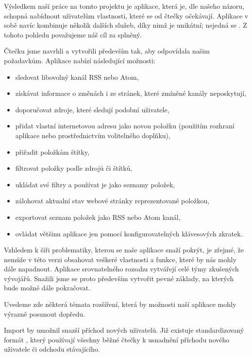 
Výsledkem naší práce na tomto projektu je aplikace, která je, dle našeho názoru, schopná nabídnout uživatelům vlastnosti, které se od čtečky očekávají.
Aplikace v sobě navíc kombinuje několik dalších služeb, díky nimž je unikátní; nejedná se .
Z tohoto pohledu považujeme náš cíl za splněný.


Čtečku jsme navrhli a vytvořili především tak, aby odpovídala našim požadavkům.
Aplikace nabízí následující možnosti:
\begin{itemize}
	\item sledovat libovolný kanál RSS nebo Atom,
	\item získávat informace o změnách i ze stránek, které zmíněné kanály neposkytují,
	\item doporučovat zdroje, které sledují podobní uživatele,
	\item přidat vlastní internetovou adresu jako novou položku (použitím rozhraní aplikace nebo prostřednictvím volitelného doplňku),
	\item přiřadit položkám štítky,
	\item filtrovat položky podle zdrojů či štítků,
	\item ukládat své filtry a používat je jako seznamy položek,
	\item zálohovat aktualní stav webové stránky reprezentované položkou,
	\item exportovat seznam položek jako RSS nebo Atom kanál,
	\item ovládat většinu aplikace jen pomocí konfigurovatelných klávesových zkratek.
\end{itemize}


Vzhledem k šíři problematiky, kterou se naše aplikace snaží pokrýt, je zřejmé, že nemůže v této verzi obsahovat veškeré vlastnosti a funkce, které by nás mohly dále napadnout.
Aplikace srovnatelného rozsahu vytvářejí celé týmy zkušených vývojářů.
Snažili jsme se proto především vytvořit pevné základy, na kterých bude možné dále pokračovat.

Uvedeme zde některá témata rozšíření, která by možnosti naší aplikace mohly výrazně posunout dopředu.

Import by umožnil snazší příchod nových uživatelů.
Již existuje standardizovaný formát , který používají všechny běžné čtečky k usnadnění příchodu nového uživatele či odchodu stávajícího.

